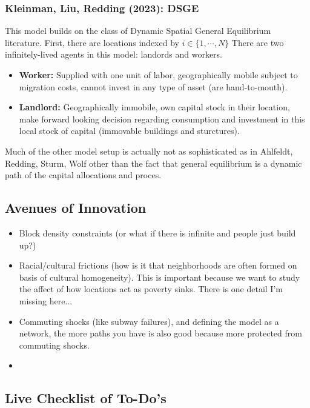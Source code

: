\documentclass[11pt,english]{article}
\begin{document}
\subsubsection{Kleinman, Liu, Redding (2023): DSGE\cite{Kleinman2023}}

This model builds on the class of Dynamic Spatial General Equilibrium literature. First, there are locations indexed by $i\in \{1, \cdots, N\}$ There are two infinitely-lived agents in this model: landords and workers. 
\begin{itemize}
\item \textbf{Worker:} Supplied with one unit of labor, geographically mobile subject to migration costs, cannot invest in any type of asset (are hand-to-mouth).

\item \textbf{Landlord:} Geographically immobile, own capital stock in their location, make forward looking decision regarding consumption and investment in this local stock of capital (immovable buildings and sturctures).
\end{itemize}

Much of the other model setup is actually not as sophisticated as in Ahlfeldt, Redding, Sturm, Wolf other than the fact that general equilibrium is a dynamic path of the capital allocations and proces.

\subsection{Avenues of Innovation}

\begin{itemize}
\item Block density constraints (or what if there is infinite and people just build up?)

\item Racial/cultural frictions (how is it that neighborhoods are often formed on basis of cultural homogeneity). This is important because we want to study the affect of how locations act as poverty sinks. There is one detail I'm missing here...

\item Commuting shocks (like subway failures), and defining the model as a network, the more paths you have is also good because more protected from commuting shocks.

\item 
\end{itemize}

\subsection{Live Checklist of To-Do's}
\end{document}

